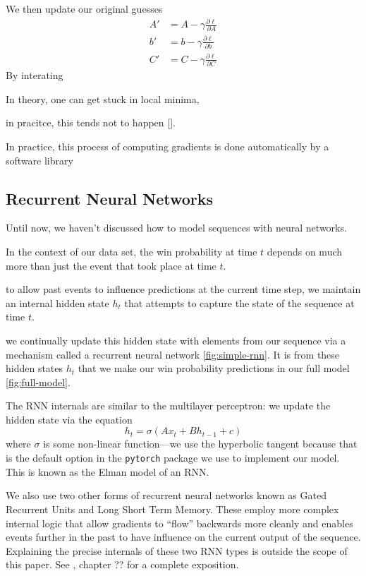 We then update our original guesses
\begin{equation}
	\begin{aligned}
		A' & = A - \gamma \frac{\partial \ell}{\partial A} \\
		b' & = b - \gamma \frac{\partial \ell}{\partial b} \\
		C' & = C - \gamma \frac{\partial \ell}{\partial C}
	\end{aligned}
\end{equation}
By interating

In theory, one can get stuck in local minima,

in pracitce, this tends not to happen [].

In practice, this process of computing gradients is done automatically by a software library

\subsection{Recurrent Neural Networks}

Until now, we haven't discussed how to model sequences with neural networks.

In the context of our data set, the win probability at time $t$ depends on much more than just the event that took place at time $t$.

to allow past events to influence predictions at the current time step, we maintain an internal hidden state $h_t$ that attempts to capture the state of the sequence at time $t$.

we continually update this hidden state with elements from our sequence via a mechanism called a recurrent neural network \autoref{fig:simple-rnn}. It is from these hidden states $h_t$ that we make our win probability predictions in our full model \autoref{fig:full-model}.

The RNN internals are similar to the multilayer perceptron: we update the hidden state via the equation
\begin{equation}
	h_t = \sigma(A x_t + Bh_{t-1} + c)
\end{equation}
where $\sigma$ is some non-linear function---we use the hyperbolic tangent because that is the default option in the \texttt{pytorch} package we use to implement our model. This is known as the Elman model of an RNN.

We also use two other forms of recurrent neural networks known as Gated Recurrent Units and Long Short Term Memory. These employ more complex internal logic that allow gradients to ``flow'' backwards more cleanly and enables events further in the past to have influence on the current output of the sequence. Explaining the precise internals of these two RNN types is outside the scope of this paper. See \textcite{PML}, chapter ?? for a complete exposition.

